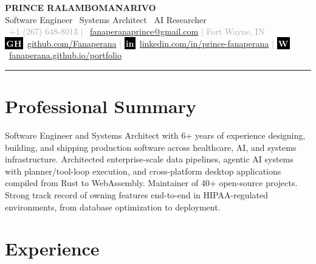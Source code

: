 \documentclass[10pt,letterpaper]{article}
\begin{document}
\begin{center}
    {\fontsize{20}{24}\selectfont\bfseries PRINCE RALAMBOMANARIVO}\\[3pt]
    {\normalsize Software Engineer \textbar\ Systems Architect \textbar\ AI Researcher}\\[5pt]
    {\small\textcolor{darkgray}{%
        \Telefon\ +1 (267) 648-8013 $\mid$
        \Letter\ \href{mailto:fanaperanaprince@gmail.com}{fanaperanaprince@gmail.com} $\mid$
        Fort Wayne, IN%
    }}\\[2pt]
    {\small\textcolor{darkgray}{%
        \colorbox{black}{\textcolor{white}{\scriptsize\bfseries\,GH\,}}\ \href{https://github.com/Fanaperana}{github.com/Fanaperana} \quad$\mid$\quad
        \colorbox{black}{\textcolor{white}{\scriptsize\bfseries\,in\,}}\ \href{http://linkedin.com/in/prince-fanaperana}{linkedin.com/in/prince-fanaperana} \quad$\mid$\quad
        \colorbox{black}{\textcolor{white}{\scriptsize\bfseries\,W\,}}\ \href{https://fanaperana.github.io/portfolio}{fanaperana.github.io/portfolio}%
    }}
\end{center}

\vspace{-4pt}
\noindent\rule{\textwidth}{0.8pt}
\vspace{-2pt}

\section{Professional Summary}
\vspace{-2pt}
{\small Software Engineer and Systems Architect with 6+ years of experience designing, building, and shipping production software across healthcare, AI, and systems infrastructure. Architected enterprise-scale data pipelines, agentic AI systems with planner/tool-loop execution, and cross-platform desktop applications compiled from Rust to WebAssembly. Maintainer of 40+ open-source projects. Strong track record of owning features end-to-end in HIPAA-regulated environments, from database optimization to deployment.}

\section{Experience}
\end{document}
